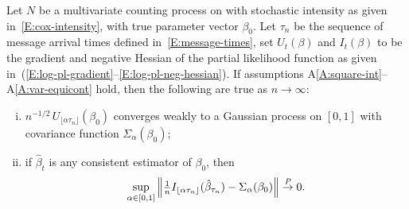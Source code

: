 \documentclass[aoas,preprint]{imsart}
\begin{document}
\begin{theorem}\label{T:score-fisher}
    Let $N$ be a multivariate counting process on with stochastic
    intensity as given in~\eqref{E:cox-intensity}, with true parameter
    vector $\beta_0$.  Let $\tau_n$ be the sequence of message arrival times
    defined in~\eqref{E:message-times}, set $U_t(\beta)$ and $I_t(\beta)$ to
    be the gradient and negative Hessian of the partial likelihood function
    as given in~(\ref{E:log-pl-gradient}--\ref{E:log-pl-neg-hessian}).  If
    assumptions A\ref{A:square-int}--A\ref{A:var-equicont} hold, then the
    following are true as $n \to \infty$:
    \begin{enumerate}[(i)]
        \item \label{I:score-part}
        $n^{-1/2} \, U_{\lfloor \alpha \tau_n \rfloor}(\beta_0)$
        converges weakly to a Gaussian process on $[0,1]$ with
        covariance function $\Sigma_\alpha(\beta_0)$;
        
        \item \label{I:fisher-part}
        if $\hat \beta_t$ is any consistent estimator of $\beta_0$,
        then
        \[
            \sup_{\alpha \in [0,1]}
            \left\|
                \tfrac{1}{n}
                I_{\lfloor \alpha \tau_n \rfloor}(\hat \beta_{\tau_n})
                -
                \Sigma_\alpha(\beta_0)
            \right\|
            \overset{\mathit{P}}{\to}
            0.
        \]
    \end{enumerate}
\end{theorem}
\end{document}

